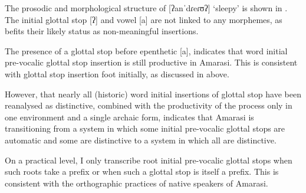 The prosodic and morphological structure of 
[ʔanˈdɾeɾʊʔ] `sleepy' is shown in .
The initial glottal stop [ʔ] and vowel [a] are not linked to any morphemes,
as befits their likely status as non-meaningful insertions.

\begin{exe}
\end{exe}

The presence of a glottal stop before epenthetic [a],
indicates that word initial pre-vocalic glottal
stop insertion is still productive in Amarasi.
This is consistent with glottal stop insertion foot initially,
as discussed in  above.

However, that nearly all (historic) word initial insertions
of glottal stop have been reanalysed as distinctive,
combined with the productivity of the process only
in one environment and a single archaic form,
indicates that Amarasi is transitioning from a system in which
some initial pre-vocalic glottal stops are automatic and some are distinctive
to a system in which all are distinctive.

On a practical level, I only transcribe root initial
pre-vocalic glottal stops when such roots take a prefix
or when such a glottal stop is itself a prefix.
This is consistent with the orthographic practices
of native speakers of Amarasi.